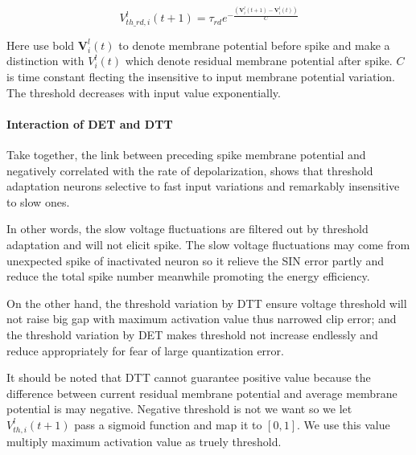 \documentclass{article}
\begin{document}
\begin{equation}
  V_{th\_rd,i}^l(t+1) = \tau_{rd}e^{-\frac{\left(\mathbf{V}_i^l(t+1)-\mathbf{V}_i^l(t)\right)}{C}}
\end{equation}

Here use bold $\mathbf{V}_i^l(t)$ to denote membrane potential before spike and make a distinction with $V_i^l(t)$ which denote residual membrane potential after spike.
$C$ is time constant flecting the insensitive to input membrane potential variation. The threshold decreases with input value exponentially.

\paragraph{Interaction of DET and DTT} Take together, the link between preceding spike membrane potential and negatively correlated with the rate of depolarization, shows that threshold adaptation neurons selective to fast input variations and remarkably insensitive to slow ones. 

In other words, the slow voltage fluctuations are filtered out by threshold adaptation and will not elicit spike. The slow voltage fluctuations may come from unexpected spike of inactivated neuron so it relieve the SIN error partly and reduce the total spike
number meanwhile promoting the energy efficiency.

On the other hand, the threshold variation by DTT ensure voltage threshold will not raise big gap with maximum activation value thus narrowed clip error; and the threshold variation by DET makes threshold not
increase endlessly and reduce appropriately for fear of large quantization error.

It should be noted that DTT cannot guarantee positive value because the difference between current residual membrane potential and average membrane potential is may negative.
Negative threshold is not we want so we let $V_{th,i}^l(t+1)$ pass a sigmoid function and map it to $[0,1]$. We use this value multiply maximum activation value as truely threshold.
\end{document}
